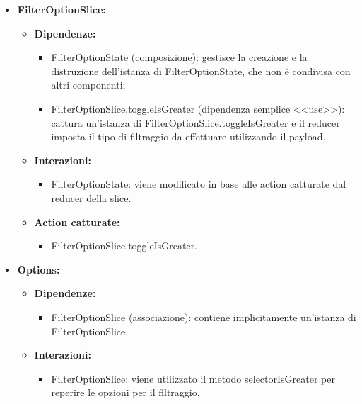 \begin{itemize}
      \item \textbf{FilterOptionSlice:}
            \begin{itemize}
                  \item \textbf{Dipendenze:}
                        \begin{itemize}
                              \item FilterOptionState (composizione): gestisce la creazione e la distruzione
                                    dell'istanza di FilterOptionState, che non è condivisa con altri componenti;
                              \item FilterOptionSlice.toggleIsGreater (dipendenza semplice <<use>>): cattura
                                    un'istanza di FilterOptionSlice.toggleIsGreater e il reducer imposta il tipo di
                                    filtraggio da effettuare utilizzando il payload.
                        \end{itemize}
                  \item \textbf{Interazioni:}
                        \begin{itemize}
                              \item FilterOptionState: viene modificato in base alle action catturate dal reducer
                                    della slice.
                        \end{itemize}
                  \item \textbf{Action catturate:}
                        \begin{itemize}
                              \item FilterOptionSlice.toggleIsGreater.
                        \end{itemize}
            \end{itemize}

      \item \textbf{Options:}
            \begin{itemize}
                  \item \textbf{Dipendenze:}
                        \begin{itemize}
                              \item FilterOptionSlice (associazione): contiene implicitamente un'istanza di
                                    FilterOptionSlice.
                        \end{itemize}
                  \item \textbf{Interazioni:}
                        \begin{itemize}
                              \item FilterOptionSlice: viene utilizzato il metodo selectorIsGreater per reperire le
                                    opzioni per il filtraggio.
                        \end{itemize}
            \end{itemize}


\end{itemize}
